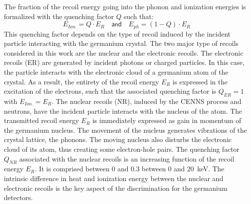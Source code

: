 The fraction of the recoil energy going into the phonon and ionization energies is formalized with the quenching factor $Q$ such that:
\begin{equation}
\label{eq:quenching-intro}
E_{Ion.} = Q \cdot E_R \quad \textsf{and} \quad E_{ph} = (1-Q) \cdot E_R
\end{equation}
This quenching factor depends on the type of recoil induced by the incident particle interacting with the germanium crystal. The two major type of recoils considered in this work are the nuclear and the electronic recoils.
The electronic recoils (ER) are generated by incident photons or charged particles. In this case, the particle interacts with the electronic cloud of a germanium atom of the crystal. As a result, the entirety of the recoil energy $E_R$ is expressed in the excitation of the electrons, such that the associated quenching factor is $Q_{ER} = 1$ with $E_{Ion.} = E_R$.
The nuclear recoils (NR), induced by the CENNS process and neutrons, have the incident particle interacts with the nucleus of the atom. The transmitted recoil energy $E_R$ is immediately expressed as gain in momentum of the germanium nucleus. The movement of the nucleus generates vibrations of the crystal lattice, the phonons. The moving nucleus also disturbs the electronic cloud of its atom, thus creating some electron-hole pairs. The quenching factor $Q_{NR}$ associated with the nuclear recoils is an increasing function of the recoil energy $E_R$. It is comprised between 0 and 0.3 between 0 and \SI{20}{\kilo\eV}.
The intrinsic difference in heat and ionization energy between the nuclear and electronic recoils is the key aspect of the discrimination for the germanium detectors.


